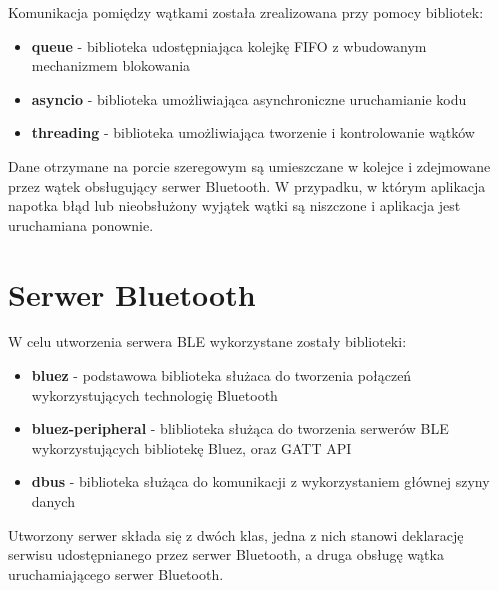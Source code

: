     Komunikacja pomiędzy wątkami została zrealizowana przy pomocy bibliotek:
    \begin{itemize}
        \item{\textbf{queue} - biblioteka udostępniająca kolejkę FIFO z wbudowanym mechanizmem blokowania}
        \item{\textbf{asyncio} - biblioteka umożliwiająca asynchroniczne uruchamianie kodu}
        \item{\textbf{threading} - biblioteka umożliwiająca tworzenie i kontrolowanie wątków}
    \end{itemize}

    Dane otrzymane na porcie szeregowym są umieszczane w kolejce i zdejmowane przez 
    wątek obsługujący serwer Bluetooth. W przypadku, w którym aplikacja napotka 
    błąd lub nieobsłużony wyjątek wątki są niszczone i aplikacja jest uruchamiana ponownie.
    
    \section {Serwer Bluetooth}
    W celu utworzenia serwera BLE wykorzystane zostały biblioteki:
    \begin{itemize}
        \item{\textbf{bluez} - podstawowa biblioteka służaca do tworzenia połączeń wykorzystujących technologię Bluetooth}
        \item{\textbf{bluez-peripheral} - bliblioteka służąca do tworzenia serwerów BLE wykorzystujących bibliotekę Bluez, oraz GATT API}
        \item{\textbf{dbus} - biblioteka służąca do komunikacji z wykorzystaniem głównej szyny danych}
    \end{itemize}
    Utworzony serwer składa się z dwóch klas, jedna z nich stanowi deklarację
    serwisu udostępnianego przez serwer Bluetooth, a druga obsługę wątka 
    uruchamiającego serwer Bluetooth.
    
